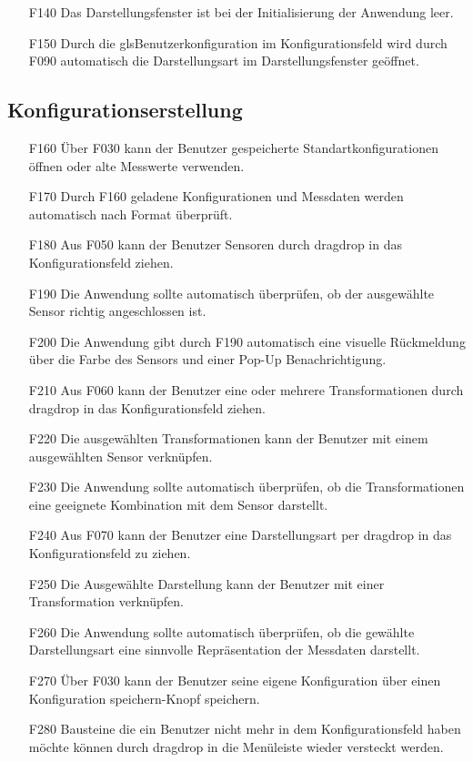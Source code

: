 \documentclass[parskip=full]{scrartcl}
\begin{document}
\begin{itemize}
\item[F140] Das Darstellungsfenster ist bei der Initialisierung der Anwendung leer.
\item[F150] Durch die gls{Benutzerkonfiguration} im Konfigurationsfeld wird durch F090 automatisch die Darstellungsart im Darstellungsfenster geöffnet.
\end{itemize}



\subsection{Konfigurationserstellung}

\begin{itemize}

\item[F160] Über F030 kann der Benutzer gespeicherte Standartkonfigurationen öffnen oder alte Messwerte verwenden.
\item[F170] Durch F160 geladene Konfigurationen und Messdaten werden automatisch nach Format überprüft.
\item[F180] Aus F050 kann der Benutzer Sensoren durch \gls{dragdrop} in das Konfigurationsfeld ziehen.
\item[F190] Die Anwendung sollte automatisch überprüfen, ob der ausgewählte Sensor richtig angeschlossen ist.
\item[F200] Die Anwendung gibt durch F190 automatisch eine visuelle Rückmeldung über die Farbe des Sensors und einer Pop-Up Benachrichtigung.
\item[F210] Aus F060 kann der Benutzer eine oder mehrere Transformationen durch \gls{dragdrop} in das Konfigurationsfeld ziehen.
\item[F220] Die ausgewählten Transformationen kann der Benutzer mit einem ausgewählten Sensor verknüpfen.
\item[F230] Die Anwendung sollte automatisch überprüfen, ob die Transformationen eine geeignete Kombination mit dem Sensor darstellt.
\item[F240] Aus F070 kann der Benutzer eine Darstellungsart per \gls{dragdrop} in das Konfigurationsfeld zu ziehen.
\item[F250] Die Ausgewählte Darstellung kann der Benutzer mit einer Transformation verknüpfen.
\item[F260] Die Anwendung sollte automatisch überprüfen, ob die gewählte Darstellungsart eine sinnvolle Repräsentation der Messdaten darstellt.
\item[F270] Über F030 kann der Benutzer seine eigene Konfiguration über einen Konfiguration speichern-Knopf speichern.
\item[F280] Bausteine die ein Benutzer nicht mehr in dem Konfigurationsfeld haben möchte können durch \gls{dragdrop} in die Menüleiste wieder versteckt werden.

\end{itemize}
\end{document}
